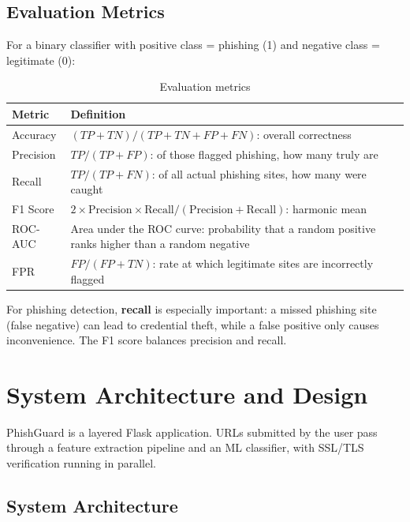 \documentclass[11pt,a4paper]{article}
\begin{document}
\subsection{Evaluation Metrics}

For a binary classifier with positive class = phishing (1) and negative class = legitimate (0):

\begin{table}[H]
\centering
\begin{tabularx}{\textwidth}{@{}p{3cm}L@{}}
\toprule
\textbf{Metric} & \textbf{Definition} \\ \midrule
Accuracy & $(TP + TN) / (TP + TN + FP + FN)$: overall correctness \\
Precision & $TP / (TP + FP)$: of those flagged phishing, how many truly are \\
Recall & $TP / (TP + FN)$: of all actual phishing sites, how many were caught \\
F1 Score & $2 \times \text{Precision} \times \text{Recall} / (\text{Precision} + \text{Recall})$: harmonic mean \\
ROC-AUC & Area under the ROC curve: probability that a random positive ranks higher than a random negative \\
FPR & $FP / (FP + TN)$: rate at which legitimate sites are incorrectly flagged \\ \bottomrule
\end{tabularx}
\caption{Evaluation metrics}
\end{table}

For phishing detection, \textbf{recall} is especially important: a missed phishing site (false negative) can lead to credential theft, while a false positive only causes inconvenience. The F1 score balances precision and recall.

\clearpage
\section{System Architecture and Design}

PhishGuard is a layered Flask application. URLs submitted by the user pass through a feature extraction pipeline and an ML classifier, with SSL/TLS verification running in parallel.

\subsection{System Architecture}
\end{document}
